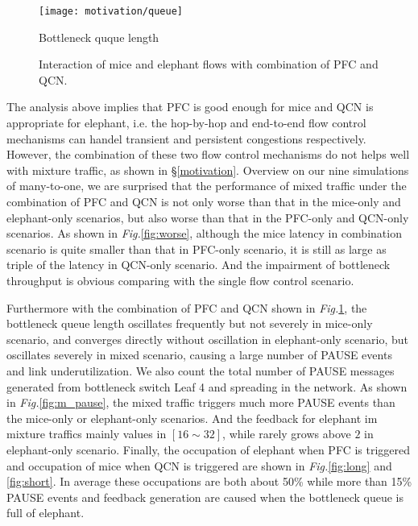 \documentclass[]{sig-alternate-10pt}
\begin{document}
\begin{figure}[t]
	\centering
	\texttt{[image: motivation/queue]}
	\caption{Bottleneck quque length}	
	\label{fig:m_queue}
\end{figure}

\begin{figure}[t]
	\centering
	\hfill
	\caption{Interaction of mice and elephant flows with combination of PFC and QCN.}
\end{figure}
The analysis above implies that PFC is good enough for mice and QCN is appropriate for elephant, i.e. the hop-by-hop and end-to-end flow control mechanisms can handel transient and persistent congestions respectively.
However, the combination of these two flow control mechanisms do not helps well with mixture traffic, as shown in \S\ref{motivation}.
Overview on our nine simulations of  many-to-one, we are surprised that the performance of mixed traffic under the combination of PFC and QCN is not only worse than that in the mice-only and elephant-only scenarios, but also worse than that in the PFC-only and  QCN-only scenarios.
As shown in \emph{Fig.}\ref{fig:worse}, although the mice latency in combination scenario is quite smaller than that in PFC-only scenario, it is still as large as triple of the latency in QCN-only scenario.
And the impairment of bottleneck throughput is obvious comparing with the single flow control scenario.

Furthermore with the combination of PFC and QCN shown in \emph{Fig.}\ref{fig:m_queue}, the bottleneck queue length oscillates frequently but not severely in mice-only scenario, and converges directly without oscillation in elephant-only scenario, but oscillates severely in mixed scenario,  causing a large number of PAUSE events and link underutilization.
We also count the total number of PAUSE messages generated from bottleneck switch Leaf 4 and spreading in the network. As shown in \emph{Fig.}\ref{fig:m_pause}, the mixed traffic triggers much more PAUSE events than the mice-only or elephant-only scenarios.
And the feedback for elephant im mixture traffics mainly values in $[16\sim32]$, while rarely grows above $2$ in elephant-only scenario.
Finally, the occupation of elephant when PFC is triggered and  occupation of mice when QCN is triggered are shown in \emph{Fig.}\ref{fig:long} and \ref{fig:short}.
In average these occupations are both about 50\% while more than 15\% PAUSE events and feedback generation are caused when the bottleneck queue is full of elephant.
\end{document}
